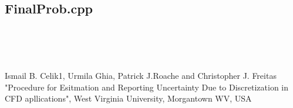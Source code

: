 \documentclass[paper=a4, fontsize=11pt, abstract=on]{scrartcl}
\numberwithin{equation}{section}		%
\numberwithin{figure}{section}			%
\numberwithin{table}{section}				%
\begin{document}
\subsection{FinalProb.cpp}
\begin{lstlisting}




\end{lstlisting}

\begin{thebibliography}{99} %
Ismail B. Celik1, Urmila Ghia, Patrick J.Roache and Christopher J. Freitas
\newblock "Procedure for Esitmation and Reporting Uncertainty Due to Discretization in CFD apllications",  West Virginia University, Morgantown WV, USA

\end{thebibliography}


\end{document}
